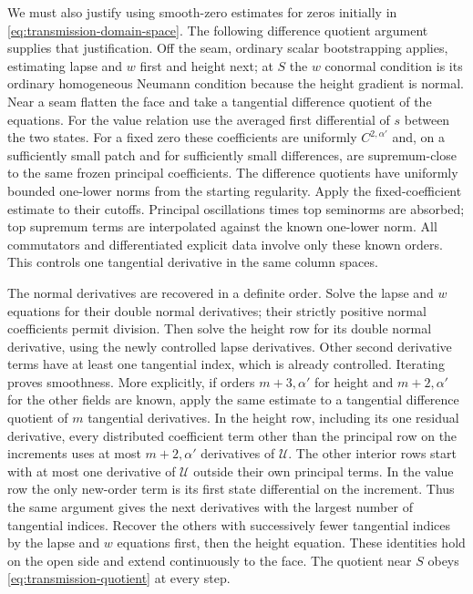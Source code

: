 We must also justify using smooth-zero estimates for zeros initially
in \eqref{eq:transmission-domain-space}.  The following difference
quotient argument supplies that justification.  Off the seam,
ordinary scalar bootstrapping applies, estimating lapse and $w$
first and height next; at $S$ the $w$ conormal condition is its
ordinary homogeneous Neumann condition because the height gradient
is normal.  Near a seam flatten the face and take a tangential
difference quotient of the equations.  For the value relation use
the averaged first differential of $s$ between the two states.
For a fixed zero these coefficients are uniformly
$C^{2,\alpha'}$ and, on a sufficiently small patch and for
sufficiently small differences, are supremum-close to the same
frozen principal coefficients.  The difference quotients have
uniformly bounded one-lower norms from the starting regularity.
Apply the fixed-coefficient estimate to their cutoffs.  Principal
oscillations times top seminorms are absorbed; top supremum terms
are interpolated against the known one-lower norm.  All
commutators and differentiated explicit data involve only these
known orders.  This controls one tangential derivative in the same
column spaces.

The normal derivatives are recovered in a definite order.  Solve
the lapse and $w$ equations for their double normal derivatives;
their strictly positive normal coefficients permit division.
Then solve the height row for its double normal derivative, using
the newly controlled lapse derivatives.  Other second derivative
terms have at least one tangential index, which is already
controlled.  Iterating proves smoothness.  More explicitly, if
orders $m+3,\alpha'$ for height and $m+2,\alpha'$ for the other
fields are known, apply the same estimate to a tangential
difference quotient of $m$ tangential derivatives.  In the height
row, including its one residual derivative, every distributed
coefficient term other than the principal row on the increments
uses at most $m+2,\alpha'$ derivatives of $\mathscr U$.
The other interior rows start with at most one derivative of
$\mathscr U$ outside their own principal terms.  In the value row
the only new-order term is its first state differential on the
increment.  Thus the same argument gives the next derivatives with
the largest number of tangential indices.  Recover the others with
successively fewer tangential indices by the lapse and $w$
equations first, then the height equation.  These identities hold
on the open side and extend continuously to the face.  The quotient
near $S$ obeys \eqref{eq:transmission-quotient} at every step.

